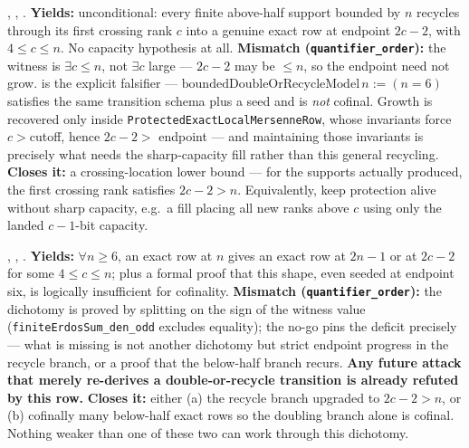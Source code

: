 \begin{obs} 
,
,
.
\textbf{Yields:} unconditional: every finite above-half support bounded by $n$ recycles through
its first crossing rank $c$ into a genuine exact row at endpoint $2c{-}2$, with $4 \le c \le n$.
No capacity hypothesis at all.
\textbf{Mismatch (\texttt{quantifier\_order}):} the witness is $\exists c \le n$, not $\exists c$
large — $2c{-}2$ may be $\le n$, so the endpoint need not grow.
is the explicit falsifier — $\mathrm{boundedDoubleOrRecycleModel}\,n := (n{=}6)$ satisfies the
same transition schema plus a seed and is \emph{not} cofinal. Growth is recovered only inside
\texttt{ProtectedExactLocalMersenneRow}, whose invariants force $c>$cutoff, hence $2c{-}2>$
endpoint — and maintaining those invariants is precisely what needs the sharp-capacity fill
rather than this general recycling.
\textbf{Closes it:} a crossing-location lower bound — for the supports actually produced, the
first crossing rank satisfies $2c{-}2>n$. Equivalently, keep protection alive without sharp
capacity, e.g.\ a fill placing all new ranks above $c$ using only the landed $c{-}1$-bit
capacity.
\end{obs}

\begin{obs} 
,
,
.
\textbf{Yields:} $\forall n \ge 6$, an exact row at $n$ gives an exact row at $2n{-}1$ or at
$2c{-}2$ for some $4 \le c \le n$; plus a formal proof that this shape, even seeded at endpoint
six, is logically insufficient for cofinality.
\textbf{Mismatch (\texttt{quantifier\_order}):} the dichotomy is proved by splitting on the sign
of the witness value (\texttt{finiteErdosSum\_den\_odd} excludes equality); the no-go pins the
deficit precisely — what is missing is not another dichotomy but strict endpoint progress in the
recycle branch, or a proof that the below-half branch recurs. \textbf{Any future attack that
merely re-derives a double-or-recycle transition is already refuted by this row.}
\textbf{Closes it:} either (a) the recycle branch upgraded to $2c{-}2>n$, or (b) cofinally many
below-half exact rows so the doubling branch alone is cofinal. Nothing weaker than one of these
two can work through this dichotomy.
\end{obs}

